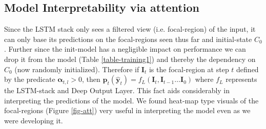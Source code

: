 \documentclass{article}
\begin{document}
\subsection{Model Interpretability via attention} Since the LSTM stack only sees a filtered view (i.e. focal-region) of the input, it can only base its predictions on the focal-regions seen thus far and initial-state $C_0$. Further since the init-model has a negligible impact on performance we can drop it from the model (Table \ref{table-training1}) and thereby the dependency on $C_0$ (now randomly initialized). Therefore if $\boldsymbol{I}_t$ is the focal-region at step $t$ defined by the predicate $\boldsymbol{\alpha}_{t,l} > 0$, then $ \boldsymbol{p}_t \left(\hat{\boldsymbol{y}}_t \right) = f_L\left( \boldsymbol{I}_t, \boldsymbol{I}_{t-1} \ldots \boldsymbol{I}_0 \right)$ where $f_L$ represents the LSTM-stack and Deep Output Layer. This fact aids considerably in interpreting the predictions of the model. We found heat-map type visuals of the focal-regions (Figure \ref{fig-att}) very useful in interpreting the model even as we were developing it.
\end{document}
